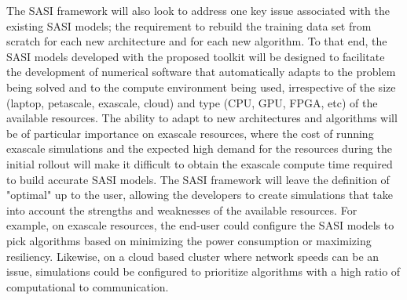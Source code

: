 The SASI framework will also look to address one key issue associated with the existing SASI models; the requirement to rebuild the training data set from scratch for each new architecture and for each new algorithm. To that end, the SASI models developed with the proposed toolkit will be designed to facilitate the development of numerical software that automatically adapts to the problem being solved and to the compute environment being used, irrespective of the size (laptop, petascale, exascale, cloud) and type (CPU, GPU, FPGA, etc) of the available resources. The ability to adapt to new architectures and algorithms will be of particular importance on exascale resources, where the cost of running exascale simulations and the expected high demand for the resources during the initial rollout will make it difficult to obtain the exascale compute time required to build accurate SASI models. The SASI framework will leave the definition of "optimal" up to the user, allowing the developers to create simulations that take into account the strengths and weaknesses of the available resources. For example, on exascale resources, the end-user could configure the SASI models to pick algorithms based on minimizing the power consumption or maximizing resiliency. Likewise, on a cloud based cluster where network speeds can be an issue, simulations could be configured to prioritize algorithms with a high ratio of computational to communication.  
